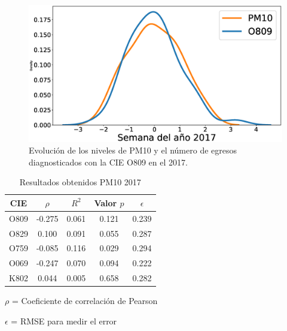 \begin{figure}[h!]
\setcounter{figure}{0} %
\captionsetup{type=figure} %
\begin{center}
   \includegraphics[trim=61 0 0 0,clip,width=1\textwidth]{PM10_O809_2017.eps}
   \end{center}
    \caption[Series de tiempo 2017 PM10 y O809]{Evolución de los niveles de PM10 y el número de egresos diagnosticados con la CIE O809 en el 2017.}
    \label{serie_de_tiempo_2017_PM10}
\end{figure}

\begin{table}[hbt!]
\centering
\caption{Resultados obtenidos PM10 2017}
\label{tab:Resultados obtenidos PM10 2017}
\vspace{0.5cm}
\begin{threeparttable}
\begin{tabular}{|c|c|c|c|c|}
	\hline
	CIE & $\rho$ & $R^2$ & Valor $p$ & $\epsilon$\\
	\hline
	O809 & -0.275 & 0.061 & 0.121 & 0.239 \\
	\hline
	O829 & 0.100 & 0.091 & 0.055 & 0.287 \\
	\hline
	O759 & -0.085 & 0.116 & 0.029 & 0.294 \\
	\hline
	O069 & -0.247 & 0.070 & 0.094 & 0.222 \\
	\hline
	K802 & 0.044 & 0.005 & 0.658 & 0.282 \\
	\hline
\end{tabular}
\begin{tablenotes}
\footnotesize
\item{$\rho$ = Coeficiente de correlación de Pearson}
\item{$\epsilon$ = RMSE para medir el error}
\end{tablenotes}
\end{threeparttable}
\end{table}

